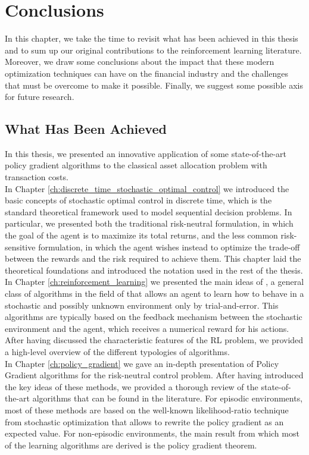 \chapter{Conclusions}
\label{ch:conlusions}

In this chapter, we take the time to revisit what has been achieved in this thesis and to sum up our original contributions to the reinforcement learning literature. Moreover, we draw some conclusions about the impact that these modern optimization techniques can have on the financial industry and the challenges that must be overcome to make it possible. Finally, we suggest some possible axis for future research. 

\section{What Has Been Achieved}
In this thesis, we presented an innovative application of some state-of-the-art policy gradient algorithms to the classical asset allocation problem with transaction costs.\\ In Chapter \ref{ch:discrete_time_stochastic_optimal_control} we introduced the basic concepts of stochastic optimal control in discrete time, which is the standard theoretical framework used to model sequential decision problems. In particular, we presented both the traditional risk-neutral formulation, in which the goal of the agent is to maximize its total returns, and the less common risk-sensitive formulation, in which the agent wishes instead to optimize the trade-off between the rewards and the risk required to achieve them. This chapter laid the theoretical foundations and introduced the notation used in the rest of the thesis.\\  
In Chapter \ref{ch:reinforcement_learning} we presented the main ideas of , a general class of algorithms in the field of  that allows an agent to learn how to behave in a stochastic and possibly unknown environment only by trial-and-error. This algorithms are typically based on the feedback mechanism between the stochastic environment and the agent, which receives a numerical reward for his actions. After having discussed the characteristic features of the \gls{RL} problem, we provided a high-level overview of the different typologies of algorithms.\\
In Chapter \ref{ch:policy_gradient} we gave an in-depth presentation of Policy Gradient algorithms for the risk-neutral control problem. After having introduced the key ideas of these methods, we provided a thorough review of the state-of-the-art algorithms that can be found in the literature. For episodic environments, most of these methods are based on the well-known likelihood-ratio technique from stochastic optimization  that allows to rewrite the policy gradient as an expected value. For non-episodic environments, the main result from which most of the learning algorithms are derived is the policy gradient theorem.\\ 
